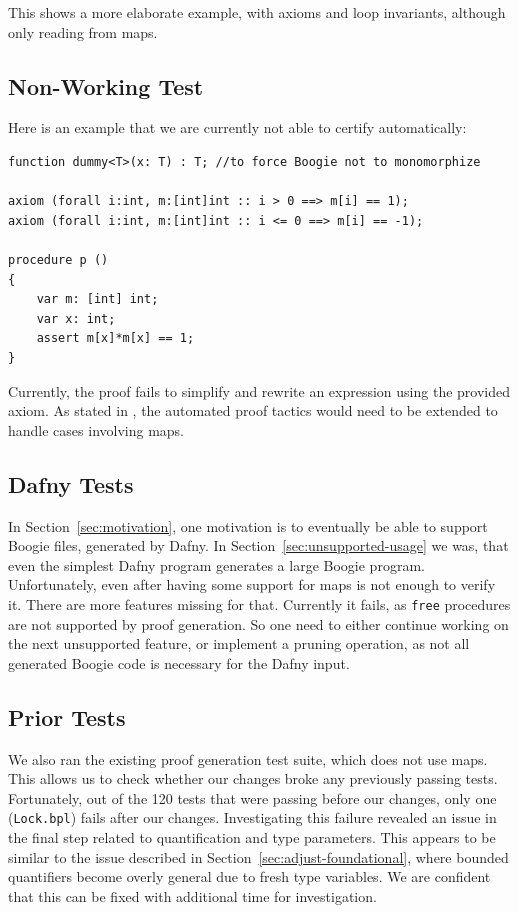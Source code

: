 This shows a more elaborate example,
with axioms and loop invariants, although only reading from maps.


\subsection{Non-Working Test}

Here is an example that we are currently not able to certify automatically:

\begin{lstlisting}[caption={Non-working test}]
function dummy<T>(x: T) : T; //to force Boogie not to monomorphize

axiom (forall i:int, m:[int]int :: i > 0 ==> m[i] == 1);
axiom (forall i:int, m:[int]int :: i <= 0 ==> m[i] == -1);

procedure p ()
{
    var m: [int] int;
    var x: int;
    assert m[x]*m[x] == 1;
}
\end{lstlisting}

Currently, the proof fails to simplify and rewrite an expression using the provided axiom.
As stated in , the automated proof tactics would need to be extended
to handle cases involving maps.


\subsection{Dafny Tests}
In Section~\ref{sec:motivation}, one motivation is to eventually be able to support Boogie files, generated by Dafny.
In Section~\ref{sec:unsupported-usage} we was, that even the simplest Dafny program
generates a large Boogie program.
Unfortunately, even after having some support for maps is not enough to verify it.
There are more features missing for that.
Currently it fails, as \lstinline[columns=fixed]{free} procedures are not supported by proof generation.
So one need to either continue working on the next unsupported feature,
or implement a pruning operation, as not all generated Boogie code is necessary for the Dafny input.


\subsection{Prior Tests}
We also ran the existing proof generation test suite, which does not use maps.
This allows us to check whether our changes broke any previously passing tests.
Fortunately, out of the 120 tests that were passing before our changes,
only one (\texttt{Lock.bpl}) fails after our changes.
Investigating this failure revealed an issue in the final step
related to quantification and type parameters.
This appears to be similar to the issue described in Section~\ref{sec:adjust-foundational},
where bounded quantifiers become overly general due to fresh type variables.
We are confident that this can be fixed with additional time for investigation.



